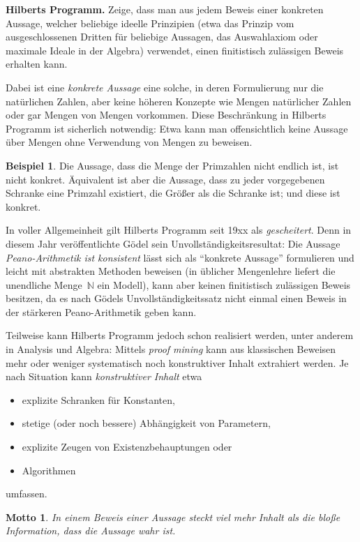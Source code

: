 \documentclass[a4paper,ngerman,12pt]{scrartcl}
\theoremstyle{definition}
\newtheorem{bsp}[defn]{Beispiel}
\theoremstyle{plain}
\newtheorem{motto}[defn]{Motto}
\theoremstyle{remark}
\newcommand{\NN}{\mathbb{N}}
\renewcommand{\_}{\mathpunct{.}\,}
\newcommand{\?}{\,{:}\,}
\begin{document}
\textbf{Hilberts Programm.} Zeige, dass man aus jedem Beweis einer konkreten
Aussage, welcher beliebige ideelle Prinzipien (etwa das Prinzip vom ausgeschlossenen
Dritten für beliebige Aussagen, das Auswahlaxiom oder maximale Ideale in der Algebra)
verwendet, einen finitistisch zulässigen Beweis erhalten kann.

Dabei ist eine \emph{konkrete Aussage} eine solche, in deren Formulierung nur
die natürlichen Zahlen, aber keine höheren Konzepte wie Mengen natürlicher
Zahlen oder gar Mengen von Mengen vorkommen. Diese Beschränkung in Hilberts
Programm ist sicherlich notwendig: Etwa kann man offensichtlich keine Aussage
über Mengen ohne Verwendung von Mengen zu beweisen.

\begin{bsp}Die Aussage, dass die Menge der Primzahlen nicht endlich ist, ist
nicht konkret. Äquivalent ist aber die Aussage, dass zu jeder vorgegebenen
Schranke eine Primzahl existiert, die Größer als die Schranke ist; und diese
ist konkret.\end{bsp}

In voller Allgemeinheit gilt Hilberts Programm seit 19xx als
\emph{gescheitert}. Denn in diesem Jahr veröffentlichte Gödel sein
Unvollständigkeitsresultat: Die Aussage \emph{Peano-Arithmetik ist konsistent}
lässt sich als "`konkrete Aussage"' formulieren und leicht mit abstrakten
Methoden beweisen (in üblicher Mengenlehre liefert die unendliche Menge~$\NN$
ein Modell), kann aber keinen finitistisch zulässigen Beweis besitzen, da es
nach Gödels Unvollständigkeitssatz nicht einmal einen Beweis in der stärkeren
Peano-Arithmetik geben kann.

Teilweise kann Hilberts Programm jedoch schon realisiert werden, unter anderem
in Analysis und Algebra: Mittels \emph{proof mining} kann aus klassischen
Beweisen mehr oder weniger systematisch noch konstruktiver Inhalt extrahiert
werden. Je nach Situation kann \emph{konstruktiver Inhalt} etwa
\begin{itemize}
\item explizite Schranken für Konstanten,
\item stetige (oder noch bessere) Abhängigkeit von Parametern,
\item explizite Zeugen von Existenzbehauptungen oder
\item Algorithmen
\end{itemize}
umfassen.

\begin{motto}\label{motto:inhaltvonbeweisen}In einem \emph{Beweis} einer
Aussage steckt viel mehr Inhalt als die bloße Information, dass die Aussage
wahr ist.\end{motto}
\end{document}

